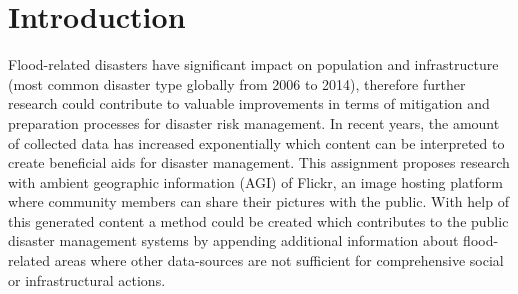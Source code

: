 \documentclass{iscram}
\begin{document}
\maketitle
{}
\section{Introduction}
Flood-related disasters have significant impact on population and infrastructure (most common disaster type globally from 2006 to 2014), therefore further research could contribute to valuable improvements in terms of mitigation and preparation processes for disaster risk management. In recent years, the amount of collected data has increased exponentially which content can be interpreted to create beneficial aids for disaster management. This assignment proposes research with ambient geographic information (AGI) of Flickr, an image hosting platform where community members can share their pictures with the public. With help of this generated content a method could be created which contributes to the public disaster management systems by appending additional information about flood-related areas where other data-sources are not sufficient for comprehensive social or infrastructural actions.   




\end{document}
